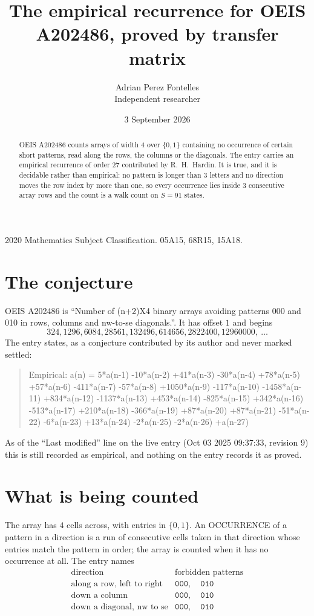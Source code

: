 \documentclass[11pt,a4paper]{article}
\title{The empirical recurrence for OEIS A202486, proved by transfer matrix}
\author{Adrian Perez Fontelles\\ \small Independent researcher}
\date{3 September 2026}
\theoremstyle{plain}
\theoremstyle{definition}
\begin{document}
\maketitle

\begin{abstract}
OEIS A202486 counts arrays of width $4$ over $\{0,1\}$ containing no occurrence of certain short
patterns, read along the rows, the columns or the diagonals. The entry carries an empirical
recurrence of order $27$ contributed by R.~H.~Hardin. It is true, and it is decidable
rather than empirical: no pattern is longer than $3$ letters and no direction moves the row
index by more than one, so every occurrence lies inside $3$ consecutive array rows and the
count is a walk count on $S=91$ states.
\end{abstract}

\noindent\small 2020 Mathematics Subject Classification. 05A15, 68R15, 15A18.\normalsize

\section{The conjecture}

OEIS A202486 is ``Number of (n+2)X4 binary arrays avoiding patterns 000 and 010 in rows, columns and nw-to-se diagonals.''. It has offset $1$ and begins
\[
324, 1296, 6084, 28561, 132496, 614656, 2822400, 12960000,\ \dots
\]
The entry states, as a conjecture contributed by its author and never marked settled:
\begin{quote}
Empirical: a(n) = 5*a(n-1) -10*a(n-2) +41*a(n-3) -30*a(n-4) +78*a(n-5) +57*a(n-6) -411*a(n-7) -57*a(n-8) +1050*a(n-9) -117*a(n-10) -1458*a(n-11) +834*a(n-12) -1137*a(n-13) +453*a(n-14) -825*a(n-15) +342*a(n-16) -513*a(n-17) +210*a(n-18) -366*a(n-19) +87*a(n-20) +87*a(n-21) -51*a(n-22) -6*a(n-23) +13*a(n-24) -2*a(n-25) -2*a(n-26) +a(n-27)
\end{quote}
As of the ``Last modified'' line on the live entry (Oct 03 2025 09:37:33, revision 9) this is still
recorded as empirical, and nothing on the entry records it as proved.

\section{What is being counted}

The array has $4$ cells across, with entries in $\{0,1\}$. An OCCURRENCE of a pattern in a
direction is a run of consecutive cells taken in that direction whose entries match the pattern
in order; the array is counted when it has no occurrence at all. The entry names
\[
\begin{array}{ll}
\text{direction} & \text{forbidden patterns} \\[2pt]
\text{along a row, left to right} & \mathtt{000},\quad \mathtt{010} \\
\text{down a column} & \mathtt{000},\quad \mathtt{010} \\
\text{down a diagonal, nw to se} & \mathtt{000},\quad \mathtt{010} \\
\end{array}
\]
\end{document}
